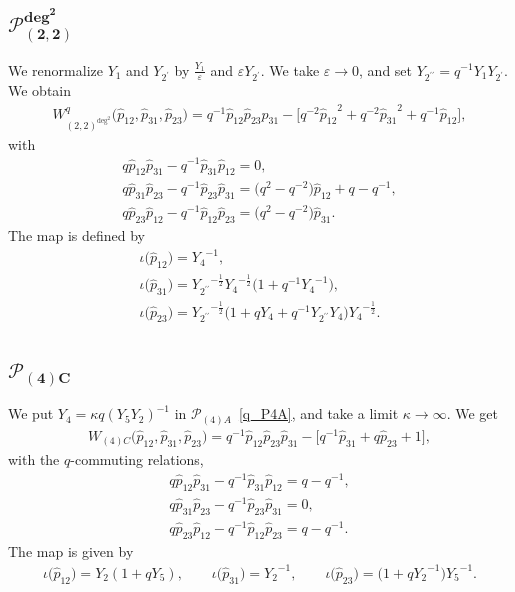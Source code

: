 \documentclass[10pt,a4paper]{amsart}
\numberwithin{equation}{section}
\begin{document}
\subsection[$\mathcal{P}_{(2,2)}^{\text{deg}^2}$]{$\boldsymbol{\mathcal{P}_{(2,2)}^{\text{deg}^2}}$}
We renormalize $Y_1$ and $Y_{2^\prime}$ by $\frac{Y_1}{\varepsilon}$ and $\varepsilon Y_{2^\prime}$. We take $\varepsilon\to 0$, and set $Y_{2^{\prime \prime}}= q^{-1} Y_1 Y_{2^\prime}$. We obtain
\begin{gather*}
 W^q_{(2,2)^{\text{deg}^2}}\big( \hat{p}_{12}, \hat{p}_{31}, \hat{p}_{23} \big) = q^{-1} \hat{p}_{12} \hat{p}_{23} \hat{p}_{31} -\big[ q^{-2} {\hat{p}_{12}}^{2} + q^{-2} {\hat{p}_{31}}^{2} + q^{-1} \hat{p}_{12}\big] ,
\end{gather*}
with
\begin{gather*}
q \hat{p}_{12} \hat{p}_{31} - q^{-1} \hat{p}_{31} \hat{p}_{12} = 0 , \\
q \hat{p}_{31} \hat{p}_{23} - q^{-1} \hat{p}_{23} \hat{p}_{31} = \big(q^2 - q^{-2}\big) \hat{p}_{12} + q - q^{-1} , \\
q \hat{p}_{23} \hat{p}_{12} - q^{-1} \hat{p}_{12} \hat{p}_{23} = \big(q^2 - q^{-2}\big) \hat{p}_{31} .
\end{gather*}
The map is defined by
\begin{gather*}
\iota\big(\hat{p}_{12}\big) = {Y_4}^{-1} , \\
\iota\big(\hat{p}_{31}\big) = {Y_{2^{\prime\prime}}}^{-\frac{1}{2}} {Y_4}^{-\frac{1}{2}}\big( 1 + q^{-1} {Y_4}^{-1}\big) , \\
\iota\big(\hat{p}_{23}\big) = {Y_{2^{\prime\prime}}}^{-\frac{1}{2}} \big( 1 + q Y_4+ q^{-1} {Y_{2^{\prime\prime}}} Y_4\big) {Y_4}^{-\frac{1}{2}} .
\end{gather*}

\subsection[$\mathcal{P}_{(4)C}$]{$\boldsymbol{\mathcal{P}_{(4)C}}$}
We put $Y_4=\kappa q ( Y_5 Y_2)^{-1}$ in $\mathcal{P}_{(4)A}$~\eqref{q_P4A}, and take a limit $\kappa\to\infty$. We get
\begin{gather*}
 W_{(4)C}\big( \hat{p}_{12}, \hat{p}_{31}, \hat{p}_{23}\big) = q^{-1} \hat{p}_{12} \hat{p}_{23} \hat{p}_{31} -\big[ q^{-1} \hat{p}_{31} + q \hat{p}_{23} + 1\big],
\end{gather*}
with the $q$-commuting relations,
\begin{gather*}
q \hat{p}_{12} \hat{p}_{31} - q^{-1} \hat{p}_{31} \hat{p}_{12} = q-q^{-1} , \\
q \hat{p}_{31} \hat{p}_{23} - q^{-1} \hat{p}_{23} \hat{p}_{31} = 0 , \\
q \hat{p}_{23} \hat{p}_{12} - q^{-1} \hat{p}_{12} \hat{p}_{23} = q - q^{-1} .
\end{gather*}
The map is given by
\begin{gather*}%
 \iota\big(\hat{p}_{12}\big) = {Y_2} ( 1 + q {Y_5} ) , \qquad \iota\big(\hat{p}_{31}\big) = {Y_2}^{-1} ,\qquad \iota\big(\hat{p}_{23}\big) = \big( 1 + q {Y_2}^{-1} \big) {Y_5}^{-1} .
\end{gather*}
\end{document}
